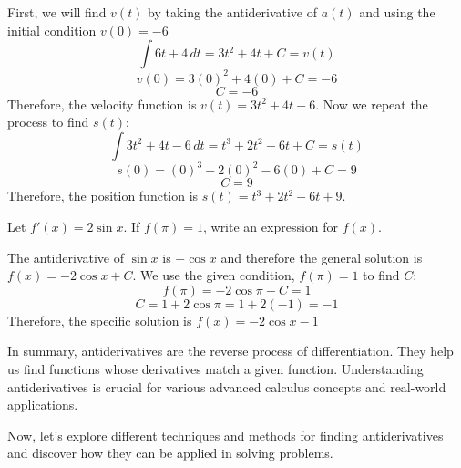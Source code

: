\begin{Answer}[ref=antideriv1]
	First, we will find $v(t)$ by taking the antiderivative of $a(t)$ and using the initial condition $v(0) = -6$
	$$\int 6t+4\,dt = 3t^2+4t+C=v(t)$$
	$$v(0) = 3(0)^2+4(0)+C=-6$$
	$$C = -6$$
	Therefore, the velocity function is $v(t) = 3t^2+4t-6$. Now we repeat the process to find $s(t)$:
	$$\int 3t^2+4t-6 \,dt = t^3+2t^2-6t+C=s(t)$$
	$$s(0) = (0)^3+2(0)^2-6(0)+C = 9$$
	$$C=9$$
	Therefore, the position function is $s(t) = t^3+2t^2-6t+9$. 
\end{Answer}

\begin{Exercise}[label=antideriv2]
	Let $f'(x) = 2\sin{x}$. If $f(\pi) = 1$, write an expression for $f(x)$. 
\end{Exercise}

\begin{Answer}[ref=antideriv2]
	The antiderivative of $\sin{x}$ is $-\cos{x}$ and therefore the general solution is $f(x) = -2\cos{x}+C$. We use the given condition, $f(\pi) = 1$ to find $C$:
	$$f(\pi) = -2\cos{\pi}+C = 1$$
	$$C = 1+2\cos{\pi}=1+2(-1) = -1$$
	Therefore, the specific solution is $f(x) = -2\cos{x}-1$
\end{Answer}

\begin{Exercise}[label=antideriv3]
		
\end{Exercise}

\begin{Answer}[ref=antideriv3]
	
\end{Answer}

In summary, antiderivatives are the reverse process of
differentiation. They help us find functions whose derivatives match a
given function. Understanding antiderivatives is crucial for various
advanced calculus concepts and real-world applications.

Now, let's explore different techniques and methods for finding
antiderivatives and discover how they can be applied in solving
problems.

